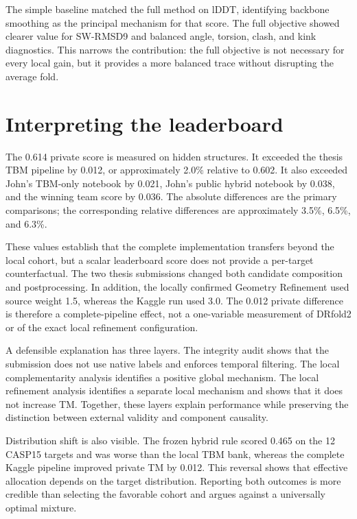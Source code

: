 \documentclass[12pt,a4paper,oneside]{report}
\begin{document}
The simple baseline matched the full method on lDDT, identifying backbone smoothing as
the principal mechanism for that score. The full objective showed clearer value for
SW-RMSD9 and balanced angle, torsion, clash, and kink diagnostics. This narrows the
contribution: the full objective is not necessary for every local gain, but it provides
a more balanced trace without disrupting the average fold.

\section{Interpreting the leaderboard}

The 0.614 private score is measured on hidden structures. It exceeded the thesis TBM
pipeline by 0.012, or approximately 2.0\% relative to 0.602. It also exceeded John's
TBM-only notebook by 0.021, John's public hybrid notebook by 0.038, and the winning team
score by 0.036. The absolute differences are the primary comparisons; the corresponding
relative differences are approximately 3.5\%, 6.5\%, and 6.3\%.

These values establish that the complete implementation transfers beyond the local
cohort, but a scalar leaderboard score does not provide a per-target counterfactual. The
two thesis submissions changed both candidate composition and postprocessing. In addition,
the locally confirmed Geometry Refinement used source weight 1.5, whereas the Kaggle run
used 3.0. The 0.012 private difference is therefore a complete-pipeline effect, not a
one-variable measurement of DRfold2 or of the exact local refinement configuration.

A defensible explanation has three layers. The integrity audit shows that the
submission does not use native labels and enforces temporal filtering. The local
complementarity analysis identifies a positive global mechanism. The local refinement
analysis identifies a separate local mechanism and shows that it does not increase TM.
Together, these layers explain performance while preserving the distinction between
external validity and component causality.

Distribution shift is also visible. The frozen hybrid rule scored 0.465 on the 12
CASP15 targets and was worse than the local TBM bank, whereas the complete Kaggle pipeline
improved private TM by 0.012. This reversal shows that effective allocation depends on the target
distribution. Reporting both outcomes is more credible than selecting the favorable
cohort and argues against a universally optimal mixture.
\end{document}
